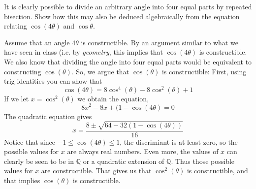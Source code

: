 \documentclass[answers]{exam}
\begin{document}
\begin{questions}
  \question It is clearly possible to divide an arbitrary angle into four equal parts by repeated bisection.  Show how this may
  also be deduced algebraically from the equation relating $\cos(4\theta)$ and $\cos \theta$.
  \begin{solution}
    Assume that an angle $4\theta$ is constructible. By an argument similar to what we have seen in class (i.e. by \emph{geometry},
    this implies that $\cos(4\theta)$ is constructible.  We also know that dividing the angle into four equal parts would be 
    equivalent to constructing $\cos(\theta)$. So, we argue that $\cos(\theta)$ is constructible: First, using trig identities you can show that 
    \[ \cos(4\theta) = 8\cos^4(\theta)-8\cos^2(\theta)+1 \]
    If we let $x = \cos^2(\theta)$ we obtain the equation,
    \[ 8x^2 - 8x + (1-\cos(4\theta) = 0\]
    The quadratic equation gives
    \[ x = \frac{8 \pm \sqrt{64 - 32(1-\cos(4\theta))}}{16} \]
    Notice that since $-1 \leq \cos(4\theta) \leq 1$, the discrimiant is at least zero, so the possible values for $x$ are always real 
    numbers.  Even more, the values of $x$ can clearly be seen to be in $\mathbb{Q}$ or a quadratic extension of $\mathbb{Q}$. Thus
    those possible values for $x$ are constructible.  That gives us that $\cos^2(\theta)$ is constructible, and that implies
    $\cos(\theta)$ is constructible.
  \end{solution}


\end{questions}
\end{document}
